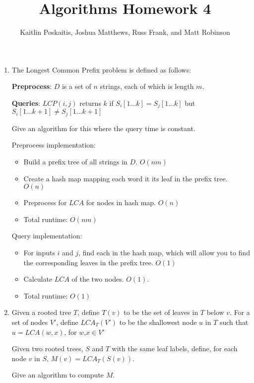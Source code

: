 \documentclass[12pt]{article}
\title{\bf Algorithms Homework 4}
\author{Kaitlin Poskaitis, Joshua Matthews, Russ Frank, and Matt Robinson}
\date{}
\begin{document}
\maketitle

\begin{enumerate}
\item The Longest Common Prefix problem is defined as follows:

    {\bf Preprocess}: $D$ is a set of $n$ strings, each of which is
        length $m$.

    {\bf Queries}: $LCP(i,j)$ returns $k$ if $S_i[1...k] = S_j[1...k]$
        but $S_i[1...k+1] \neq S_j[1...k+1]$

Give an algorithm for this where the query time is constant.

Preprocess implementation:
\begin{itemize}
    \item Build a prefix tree of all strings in $D$. $O(nm)$
    \item Create a hash map mapping each word it its leaf in the prefix tree.
        $O(n)$
    \item Preprocess for $LCA$ for nodes in hash map. $O(n)$
    \item Total runtime: $O(nm)$
\end{itemize}

Query implementation:
\begin{itemize}
    \item For inputs $i$ and $j$, find each in the hash map, which will allow
        you to find the corresponding leaves in the prefix tree. $O(1)$
    \item Calculate $LCA$ of the two nodes. $O(1)$.
    \item Total runtime: $O(1)$
\end{itemize}

\item Given a rooted tree $T$, define $T(v)$ to be the set of leaves in $T$
    below $v$. For a set of nodes $V'$, define $LCA_T(V')$ to be the shallowest
    node $u$ in $T$ such that $u = LCA(w,x)$, for $w$,$x \in V'$

    Given two rooted trees, $S$ and $T$ with the same leaf labels, define, for
    each node $v$ in $S$, $M(v) = LCA_T(S(v))$.

    Give an algorithm to compute $M$.


\end{enumerate}
\end{document}
